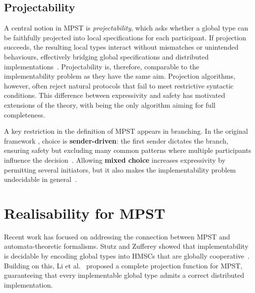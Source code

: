 
\subsection{Projectability}
A central notion in MPST is \emph{projectability}, which asks whether 
a global type can be faithfully projected into local specifications for 
each participant. If projection succeeds, the resulting local types 
interact without mismatches or unintended behaviours, effectively 
bridging global specifications and distributed implementations~\cite{honda2008multiparty}.  
Projectability is, therefore, comparable to the implementability
problem as they have the same aim.
Projection algorithms, however, often reject natural protocols that 
fail to meet restrictive syntactic conditions. This difference between 
expressivity and safety has motivated extensions of the theory, with 
\cite{castagna2012global} being the only algorithm aiming for full 
completeness.

A key restriction in the definition of MPST appears in branching. 
In the original framework \cite{honda2008multiparty,carbone2012structured}, 
choice is \textbf{sender-driven}: the first sender dictates the branch, 
ensuring safety but excluding many common patterns where multiple 
participants influence the decision~\cite{carbone2012structured}.  
Allowing \textbf{mixed choice} increases expressivity by permitting 
several initiators, but it also makes the implementability problem 
undecidable in general~\cite{stutz2024implementability}.  


\section{Realisability for MPST}
Recent work has focused on addressing the connection between MPST 
and automata-theoretic formalisms. Stutz and Zufferey 
showed that implementability is decidable by encoding global types 
into HMSCs that are globally cooperative~\cite{stutz2022comparing,stutz2023asynchronous}. 
Building on this, Li et al.~\cite{li2023complete} proposed a complete 
projection function for MPST, guaranteeing that every implementable 
global type admits a correct distributed implementation.

